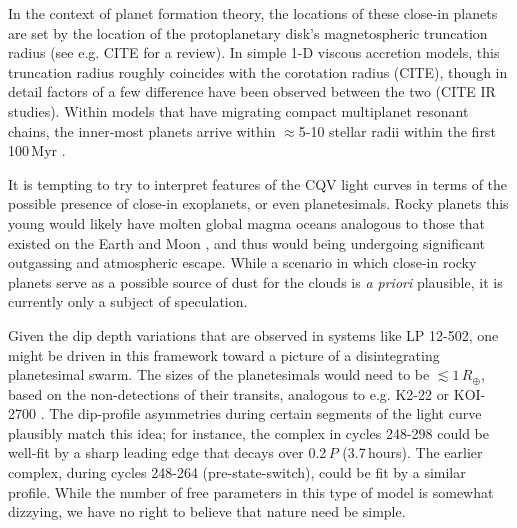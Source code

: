 \documentclass[11pt,twocolumn,tighten]{aastex63}
\begin{document}
In the context of planet formation theory, the locations of these
close-in planets are set by the location of the protoplanetary disk's
magnetospheric truncation radius (see e.g. CITE for a review).  In
simple 1-D viscous accretion models, this truncation radius roughly
coincides with the corotation radius (CITE), though in detail factors
of a few difference have been observed between the two (CITE IR
studies).  Within models that have migrating compact multiplanet
resonant chains, the inner-most planets arrive within $\approx$5-10
stellar radii within the first 100\,Myr \citep{2018haex.bookE.142I}.

It is tempting to try to interpret features of the CQV light curves in
terms of the possible presence of close-in exoplanets, or even
planetesimals.  Rocky planets this young would likely have molten
global magma oceans analogous to those that existed on the Earth and
Moon \citep[see][]{2022arXiv220310023L}, and thus would being
undergoing significant outgassing and atmospheric escape.  While a
scenario in which close-in rocky planets serve as a possible source of
dust for the clouds is {\it a priori} plausible, it is currently only
a subject of speculation.

Given the dip depth variations that are observed in systems like LP
12-502, one might be driven in this framework toward a picture of a
disintegrating planetesimal swarm.  The sizes of the planetesimals
would need to be $\lesssim 1$\,$R_\oplus$, based on the non-detections
of their transits, analogous to e.g.  K2-22
\citep{2015ApJ...812..112S} or KOI-2700 \citep{2014ApJ...784...40R}.
The dip-profile asymmetries during certain segments of the light curve
plausibly match this idea; for instance, the complex in cycles 248-298
could be well-fit by a sharp leading edge that decays over 0.2\,$P$
(3.7\,hours).  The earlier complex, during cycles 248-264
(pre-state-switch), could be fit by a similar profile.  While the
number of free parameters in this type of model is somewhat dizzying,
we have no right to believe that nature need be simple.


\end{document}
